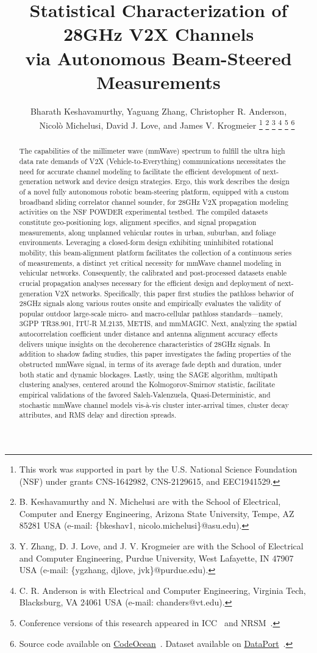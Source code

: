 \documentclass[10pt, twocolumn]{IEEEtran}
\title{Statistical Characterization of 28GHz V2X Channels\\ via Autonomous Beam-Steered Measurements}
\author{Bharath Keshavamurthy, Yaguang Zhang, Christopher R. Anderson,\\\ \ \ \ Nicol\`{o} Michelusi, David J. Love, and James V. Krogmeier
\thanks{This work was supported in part by the U.S. National Science Foundation (NSF) under grants CNS-1642982, CNS-2129615, and EEC1941529.}
\thanks{B. Keshavamurthy and N. Michelusi are with the School of Electrical, Computer and Energy Engineering, Arizona State University, Tempe, AZ 85281 USA (e-mail: \{bkeshav1, nicolo.michelusi\}@asu.edu).}
\thanks{Y. Zhang, D. J. Love, and J. V. Krogmeier are with the School of Electrical and Computer Engineering, Purdue University, West Lafayette, IN 47907 USA (e-mail: \{ygzhang, djlove, jvk\}@purdue.edu).}
\thanks{C. R. Anderson is with Electrical and Computer Engineering, Virginia Tech, Blacksburg, VA 24061 USA (e-mail: chanders@vt.edu).}
\thanks{Conference versions of this research appeared in ICC~\cite{SPAVE_ICC} and NRSM~\cite{SPAVE_NRSM}.}
\thanks{Source code available on \href{https://codeocean.com/capsule/9545863/tree}{CodeOcean}~\cite{CodeOcean}. Dataset available on \href{http://ieee-dataport.org/12580}{DataPort}~\cite{DataPort}.}
\vspace{-10mm}
}
\begin{document}

\maketitle


\begin{abstract}
The capabilities of the millimeter wave (mmWave) spectrum to fulfill the ultra high data rate demands of V2X (Vehicle-to-Everything) communications necessitates the need for accurate channel modeling to facilitate the efficient development of next-generation network and device design strategies. Ergo, this work describes the design of a novel fully autonomous robotic beam-steering platform, equipped with a custom broadband sliding correlator channel sounder, for 28GHz V2X propagation modeling activities on the NSF POWDER experimental testbed. The compiled datasets constitute geo-positioning logs, alignment specifics, and signal propagation measurements, along unplanned vehicular routes in urban, suburban, and foliage environments. Leveraging a closed-form design exhibiting uninhibited rotational mobility, this beam-alignment platform facilitates the collection of a continuous series of measurements, a distinct yet critical necessity for mmWave channel modeling in vehicular networks. Consequently, the calibrated and post-processed datasets enable crucial propagation analyses necessary for the efficient design and deployment of next-generation V2X networks. Specifically, this paper first studies the pathloss behavior of 28GHz signals along various routes onsite and empirically evaluates the validity of popular outdoor large-scale micro- and macro-cellular pathloss standards---namely, 3GPP TR38.901, ITU-R M.2135, METIS, and mmMAGIC. Next, analyzing the spatial autocorrelation coefficient under distance and antenna alignment accuracy effects delivers unique insights on the decoherence characteristics of 28GHz signals. In addition to shadow fading studies, this paper investigates the fading properties of the obstructed mmWave signal, in terms of its average fade depth and duration, under both static and dynamic blockages. Lastly, using the SAGE algorithm, multipath clustering analyses, centered around the Kolmogorov-Smirnov statistic, facilitate empirical validations of the favored Saleh-Valenzuela, Quasi-Deterministic, and stochastic mmWave channel models vis-\`{a}-vis cluster inter-arrival times, cluster decay attributes, and RMS delay and direction spreads.
\end{abstract}
\vspace{-1mm}
\end{document}
